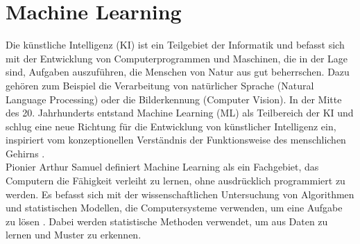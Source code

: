 \documentclass[german,bachelor]{swsLeipzig}
\begin{document}
\section{Machine Learning}
Die künstliche Intelligenz (KI) ist ein Teilgebiet der Informatik und befasst sich mit der Entwicklung von Computerprogrammen und Maschinen,
die in der Lage sind, Aufgaben auszuführen, die Menschen von Natur aus gut beherrschen.
Dazu gehören zum Beispiel die Verarbeitung von natürlicher Sprache (Natural Language Processing) oder die Bilderkennung (Computer Vision).
In der Mitte des 20. Jahrhunderts entstand Machine Learning (ML) als Teilbereich der KI und schlug eine neue Richtung
für die Entwicklung von künstlicher Intelligenz ein, inspiriert vom konzeptionellen Verständnis der Funktionsweise des menschlichen Gehirns \cite[]{2020}.\\
\indent Pionier Arthur Samuel definiert Machine Learning als ein Fachgebiet, das Computern die Fähigkeit verleiht zu lernen,
ohne ausdrücklich programmiert zu werden.
Es befasst sich mit der wissenschaftlichen Untersuchung von Algorithmen und statistischen Modellen,
die Computersysteme verwenden, um eine Aufgabe zu lösen \cite[]{mahesh2020machine}.
Dabei werden statistische Methoden verwendet, um aus Daten zu lernen und Muster zu erkennen. \\
\end{document}
